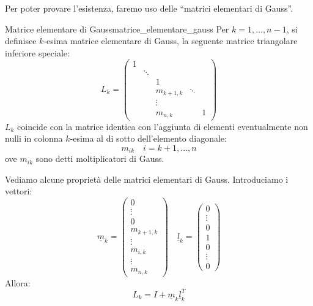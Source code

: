 \documentclass[12pt]{report}
\newcounter{definition}
\newcommand{\nmu}{}
\begin{document}
Per poter provare l'esistenza, faremo uso delle ``matrici elementari di Gauss''.
\begin{definition}{\nmu Matrice elementare di Gauss}{matrice_elementare_gauss}
	Per $k = 1, \dots, n-1$, si definisce $k$-esima matrice elementare di Gauss, la seguente matrice triangolare inferiore speciale:
	\[
	L_k = \begin{pmatrix}
1 & & & & \\
& \ddots & & & \\
& & 1 & & \\
& & m_{k+1, k} & \ddots & \\
& & \vdots & & \\
& & m_{n, k} & & 1
\end{pmatrix}
	\]
	$L_k$ coincide con la matrice identica con l'aggiunta di elementi eventualmente non nulli in colonna $k$-esima al di sotto dell'elemento diagonale:
	\[
	m_{ik} \quad i = k+1, \dots, n
	\]
	ove $m_{ik}$ sono detti moltiplicatori di Gauss.
\end{definition}
Vediamo alcune proprietà delle matrici elementari di Gauss. Introduciamo i vettori:
\[
\underline{m}_k = \begin{pmatrix}
	0 \\
	\vdots \\
	0 \\
	m_{k+1, k} \\
	\vdots \\
	m_{i, k} \\
	\vdots \\
	m_{n, k}
\end{pmatrix} \quad \underline{l}_k = \begin{pmatrix}
	0 \\
	\vdots \\
	0 \\
	1 \\
	0 \\
	\vdots \\
	0
\end{pmatrix}
\]
Allora:
\[
L_k = I + \underline{m}_k\underline{l}_k^T
\]
\end{document}
